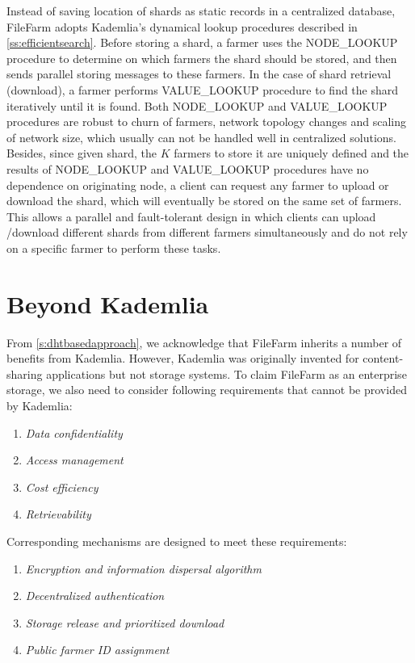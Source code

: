 Instead of saving location of shards as static records in a centralized database, FileFarm adopts Kademlia's dynamical lookup procedures described in \ref{ss:efficientsearch}. Before storing a shard, a farmer uses the NODE\_LOOKUP procedure to determine on which farmers the shard should be stored, and then sends parallel storing messages to these farmers. In the case of shard retrieval (download), a farmer performs VALUE\_LOOKUP procedure to find the shard iteratively until it is found. Both NODE\_LOOKUP and VALUE\_LOOKUP procedures are robust to churn of farmers, network topology changes and scaling of network size, which usually can not be handled well in centralized solutions. Besides, since given shard, the $K$ farmers to store it are uniquely defined and the results of NODE\_LOOKUP and VALUE\_LOOKUP procedures have no dependence on originating node, a client can request any farmer to upload or download the shard, which will eventually be stored on the same set of farmers. This allows a parallel and fault-tolerant design in which clients can upload /download different shards from different farmers simultaneously and do not rely on a specific farmer to perform these tasks.

\section{Beyond Kademlia}
\label{s:beyondkademlia}

From \ref{s:dhtbasedapproach}, we acknowledge that FileFarm inherits a number of benefits from Kademlia. However, Kademlia was originally invented for content-sharing applications but not storage systems. To claim FileFarm as an enterprise storage, we also need to consider following requirements that cannot be provided by Kademlia:

\begin{enumerate}
  \item \textit{Data confidentiality}
  \item \textit{Access management}
  \item \textit{Cost efficiency}
  \item \textit{Retrievability}
\end{enumerate}

\noindent Corresponding mechanisms are designed to meet these requirements:

\begin{enumerate}
  \item \textit{Encryption and information dispersal algorithm}
  \item \textit{Decentralized authentication}
  \item \textit{Storage release and prioritized download}
  \item \textit{Public farmer ID assignment}
\end{enumerate}

